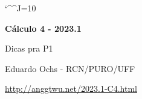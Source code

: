 \documentclass[oneside,12pt]{article}
\begin{document}

\def\drafturl{http://anggtwu.net/LATEX/2023-1-C4.pdf}
\def\drafturl{http://anggtwu.net/2023.1-C4.html}
\def\draftfooter{\tiny \href{\drafturl}{\jobname{}} \ColorBrown{\shorttoday{} \hours}}


\catcode`\^^J=10

\def\Caurl   #1{\expr{Caurl("#1")}}
\def\Cahref#1#2{\href{\Caurl{#1}}{#2}}
\def\Ca      #1{\Cahref{#1}{#1}}

\def\pictgridstyle{\color{GrayPale}\linethickness{0.3pt}}
\def\pictaxesstyle{\linethickness{0.5pt}}
\def\pictnaxesstyle{\color{GrayPale}\linethickness{0.5pt}}
\celllower=2.5pt

\pu



%

\thispagestyle{empty}

\begin{center}

\vspace*{1.2cm}

{\bf \Large Cálculo 4 - 2023.1}

\bsk

Dicas pra P1

\bsk

Eduardo Ochs - RCN/PURO/UFF

\url{http://anggtwu.net/2023.1-C4.html}

\end{center}

\newpage
\end{document}
